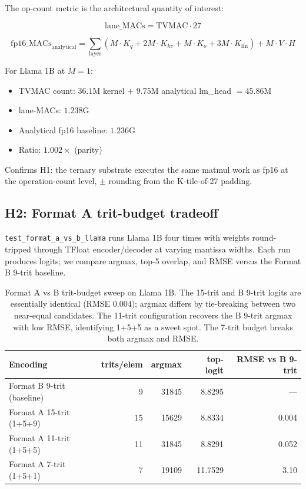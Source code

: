 \documentclass{article}
\begin{document}
The op-count metric is the architectural quantity of interest:

\begin{equation}
  \mathrm{lane\_MACs} = \mathrm{TVMAC} \cdot 27
\end{equation}

\begin{equation}
  \mathrm{fp16\_MACs}_\text{analytical} = \sum_\text{layer}
    (M \cdot K_q + 2 M \cdot K_{kv} + M \cdot K_o + 3 M \cdot K_\text{ffn})
    + M \cdot V \cdot H
\end{equation}

For Llama 1B at $M{=}1$:
\begin{itemize}
  \item TVMAC count: $36.1$M kernel + $9.75$M analytical lm\_head $= 45.86$M
  \item lane-MACs: $1.238$G
  \item Analytical fp16 baseline: $1.236$G
  \item Ratio: $\mathbf{1.002\times}$ (parity)
\end{itemize}

Confirms H1: the ternary substrate executes the same matmul work as fp16
at the operation-count level, $\pm$ rounding from the {K}-tile-of-27 padding.

\subsection{H2: Format A trit-budget tradeoff}

\texttt{test\_format\_a\_vs\_b\_llama} runs Llama 1B four times with
weights round-tripped through {TFloat} encoder/decoder at varying
mantissa widths. Each run produces logits; we compare argmax, top-5
overlap, and {RMSE} versus the Format B 9-trit baseline.

\begin{table}[h]
\centering
\begin{tabular}{lrrrr}
\toprule
Encoding & trits/elem & argmax & top-logit & {RMSE} vs B 9-trit \\
\midrule
Format B 9-trit (baseline) & 9 & 31845 & 8.8295 & --- \\
Format A 15-trit (1+5+9) & 15 & 15629 & 8.8334 & 0.004 \\
Format A 11-trit (1+5+5) & 11 & 31845 & 8.8291 & 0.052 \\
Format A 7-trit (1+5+1) & 7 & 19109 & 11.7529 & 3.10 \\
\bottomrule
\end{tabular}
\caption{Format A vs B trit-budget sweep on Llama 1B. The 15-trit and B
9-trit logits are essentially identical (RMSE 0.004); argmax differs
by tie-breaking between two near-equal candidates. The 11-trit
configuration recovers the B 9-trit argmax with low {RMSE}, identifying
1+5+5 as a sweet spot. The 7-trit budget breaks both argmax and
{RMSE}.}
\end{table}
\end{document}
